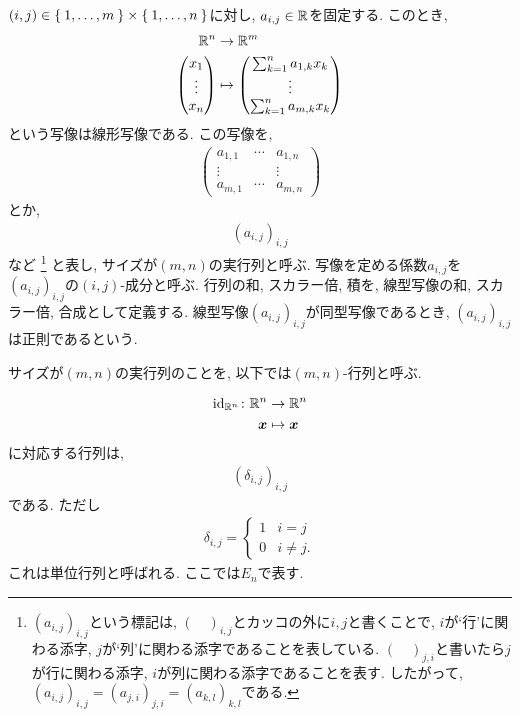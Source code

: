 \begin{definition}
$(i,j)\in\Set{1,\ldots,m}\times \Set{1,\ldots,n}$に対し,
$a_{i,j}\in\mathbb{R}$を固定する.
このとき,
\begin{align*}
  \mathbb{R}^n&\to \mathbb{R}^m\\
  \begin{pmatrix}x_1\\\vdots\\x_n\end{pmatrix}&\mapsto
    \begin{pmatrix}\sum_{k=1}^n a_{1,k}x_k\\\vdots\\\sum_{k=1}^n a_{m,k}x_k\end{pmatrix}
\end{align*}
という写像は線形写像である.
この写像を,
\begin{align*}
  \begin{pmatrix}
    a_{1,1}&\cdots &a_{1,n}\\
    \vdots& &\vdots\\
    a_{m,1}&\cdots &a_{m,n}
  \end{pmatrix}
\end{align*}
とか,
\begin{align*}
  (a_{i,j})_{i,j}
\end{align*}
など%
\footnote{$(a_{i,j})_{i,j}$という標記は, $(\quad)_{i,j}$とカッコの外に$i,j$と書くことで, $i$が`行'に関わる添字, $j$が`列'に関わる添字であることを表している.
$(\quad)_{j,i}$と書いたら$j$が行に関わる添字, $i$が列に関わる添字であることを表す.
したがって, $(a_{i,j})_{i,j}=(a_{j,i})_{j,i}=(a_{k,l})_{k,l}$である.}%
と表し,
サイズが$(m,n)$の実行列と呼ぶ.
写像を定める係数$a_{i,j}$を
$(a_{i,j})_{i,j}$の$(i,j)$-成分と呼ぶ.
行列の和, スカラー倍, 積を,
線型写像の和, スカラー倍, 合成として定義する.
線型写像$(a_{i,j})_{i,j}$が同型写像であるとき,
$(a_{i,j})_{i,j}$は正則であるという.
\end{definition}
\begin{remark}
  サイズが$(m,n)$の実行列のことを,
以下では$(m,n)$-行列と呼ぶ.
\end{remark}
\begin{remark}
\begin{align*}
\operatorname{id}_{\mathbb{R}^n} \colon \mathbb{R}^n&\to \mathbb{R}^n\\
 \boldsymbol{x} &\mapsto \boldsymbol{x}
\end{align*}
  に対応する行列は,
\begin{align*}
  (\delta_{i,j})_{i,j}
\end{align*}
である.
ただし
\begin{align*}
  \delta_{i,j}=
  \begin{cases}
    1&i=j\\
    0&i\neq j.
  \end{cases}
\end{align*}
これは単位行列と呼ばれる.
ここでは$E_n$で表す.
\end{remark}


